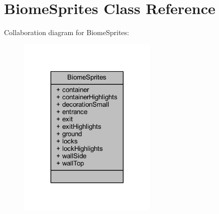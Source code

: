 \hypertarget{class_biome_sprites}{}\section{Biome\+Sprites Class Reference}
\label{class_biome_sprites}


Collaboration diagram for Biome\+Sprites\+:\nopagebreak
\begin{figure}[H]
\begin{center}
\leavevmode
\includegraphics[width=188pt]{class_biome_sprites__coll__graph}
\end{center}
\end{figure}
